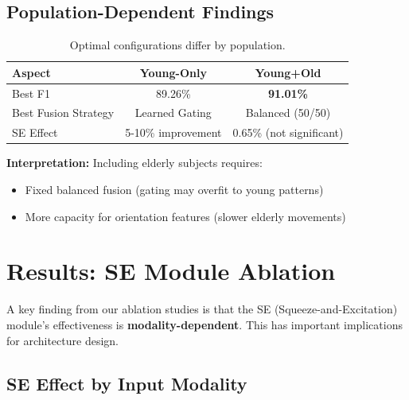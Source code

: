 \documentclass{article}
\begin{document}
\subsection{Population-Dependent Findings}

\begin{table}[htbp]
    \centering
    \caption{Optimal configurations differ by population.}
    \label{tab:population_diff}
    \begin{tabular}{lcc}
        \toprule
        \textbf{Aspect} & \textbf{Young-Only} & \textbf{Young+Old} \\
        \midrule
        Best F1 & 89.26\% & \textbf{91.01\%} \\
        Best Fusion Strategy & Learned Gating & Balanced (50/50) \\
        SE Effect & 5-10\% improvement & 0.65\% (not significant) \\
        \bottomrule
    \end{tabular}
\end{table}

\textbf{Interpretation:} Including elderly subjects requires:
\begin{itemize}
    \item Fixed balanced fusion (gating may overfit to young patterns)
    \item More capacity for orientation features (slower elderly movements)
\end{itemize}

\section{Results: SE Module Ablation}

A key finding from our ablation studies is that the SE (Squeeze-and-Excitation) module's effectiveness is \textbf{modality-dependent}. This has important implications for architecture design.

\subsection{SE Effect by Input Modality}
\end{document}
